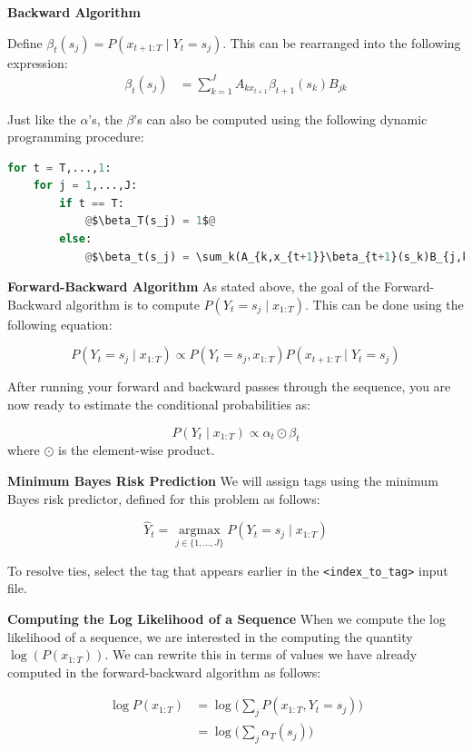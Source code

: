 \documentclass[11pt,addpoints,answers]{exam}
\newcommand \argmax {\operatorname*{argmax}}
\begin{document}
\vspace{0.2 in}
\textbf{Backward Algorithm}

Define $\beta_t(s_j) = P(x_{t+1:T} \mid Y_t=s_j)$. This can be rearranged into the following expression:
\begin{align}
    \label{eqn:beta}
    \beta_t(s_j) &= \sum_{k=1}^J A_{kx_{t+1}}\beta_{t+1}(s_k)B_{jk}
\end{align}


Just like the $\alpha$'s, the $\beta$'s can also be computed using the following dynamic programming procedure:

\begin{lstlisting}[language=Python,escapechar=@]
for t = T,...,1:
    for j = 1,...,J:
        if t == T:
            @$\beta_T(s_j) = 1$@
        else:
            @$\beta_t(s_j) = \sum_k(A_{k,x_{t+1}}\beta_{t+1}(s_k)B_{j,k})$@
\end{lstlisting}

\clearpage
\textbf{Forward-Backward Algorithm}
As stated above, the goal of the Forward-Backward algorithm is to compute $P(Y_t =s_j \mid x_{1:T})$. This can be done using the following equation:

$$P(Y_t =s_j \mid x_{1:T}) \propto P(Y_t=s_j, x_{1:T})P(x_{t+1:T} \mid Y_t=s_j) $$

After running your forward and backward passes through the sequence, you are now ready to estimate the conditional probabilities as:

$$P(Y_t \mid x_{1:T}) \propto \alpha_t\odot\beta_t$$
where $\odot$ is the element-wise product.

\vspace{0.4 in}
\textbf{Minimum Bayes Risk Prediction}
We will assign tags using the minimum Bayes risk predictor, defined for this problem as follows:

$$\hat{Y}_t = \argmax_{j\in \{1,\dots,J\}} P(Y_t = s_j \mid x_{1:T})$$

To resolve ties, select the tag that appears earlier in the \texttt{<index\_to\_tag>} input file.

\textbf{Computing the Log Likelihood of a Sequence}
When we compute the log likelihood of a sequence, we are interested in the computing the quantity $\log(P(x_{1:T}))$. We can rewrite this in terms of values we have already computed in the forward-backward algorithm as follows:

\begin{align*}
    \log{P(x_{1:T})} &= \log{\big(\sum_j P(x_{1:T},Y_t=s_j)\big)}\\
    &= \log{\big(\sum_j \alpha_T(s_j)\big)}
\end{align*}
\end{document}
